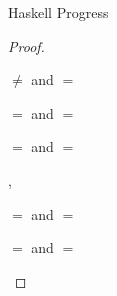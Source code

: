 \begin{theorem}{Haskell Progress}
\begin{proof}
\begin{case}{\pshm}
\begin{subcase}{\first{\vartyh} $\neq$ \tylump and \first{\vartym} $=$ \tylump}
\end{subcase}


\begin{subcase}{\first{\vartyh} $=$ \tynum and \first{\vartym} $=$ \tynum}

\psvaleqm
{\first{\varexpm}}
{\tynum}
{\expnum{\varnum}}
\psred
{\exphm{\tynum}{\tynum}{\expnum{\varnum}}}
{\expnum{\varnum}}

\end{subcase}


\renewcommand{\w}{\tylist{\second{\vartyh}}}
\renewcommand{\x}{\tylist{\second\vartym}}
\renewcommand{\y}{\expnils{\third{\vartym}}}
\renewcommand{\z}{\expcons{\first{\varvalum}}{\second{\varvalum}}}

\begin{subcase}{\first{\vartyh} $=$ \w and \first{\vartym} $=$ \x}

\psvalinm
{\first{\varexpm}}
{\tylist{\third{\vartym}}}
{\y, \z}
\psred
{\exphm{\w}{\x}{(\y)}}
{\expnils{\second{\vartyh}}}
\psred
{\exphm{\w}{\x}{(\z)}}
{\expcons{(\exphm{\second{\vartyh}}{\second{\vartym}}{\first{\varvalum}})}{(\exphm{\w}{\x}{\second{\varvalum}})}}

\end{subcase}


\renewcommand{\x}{\tyfun{\second{\vartyh}}{\third{\vartyh}}}
\renewcommand{\y}{\tyfun{\second{\vartym}}{\third{\vartym}}}
\renewcommand{\z}{\expfabss{\varvarm}{\fourth{\vartym}}{\second{\varexpm}}}

\begin{subcase}{\first{\vartyh} $=$ \x and \first{\vartym} $=$ \y}

\psvaleqm
{\first{\varexpm}}
{\tyfun{\fourth{\vartym}}{\fifth{\vartym}}}
{\z}
\psred
{\exphm{(\x)}{(\y)}{(\z)}}
{\expfabss{\varvarh}{\second{\vartyh}}{\exphm{\third{\vartyh}}{\third{\vartym}}{(\expfapp{(\z)}{(\expmh{\second{\vartym}}{\second{\vartyh}}{\varvarh})})}}}

\end{subcase}


\renewcommand{\x}{\tyfor{\first{\tyvarh}}{\second{\vartyh}}}
\renewcommand{\y}{\tyfor{\first{\tyvarm}}{\second{\vartym}}}
\renewcommand{\z}{\exptabs{\second{\tyvarm}}{\second{\varexpm}}}

\begin{subcase}{\first{\vartyh} $=$ \x and \first{\vartym} $=$ \y}


\end{subcase}
\end{case}
\end{proof}
\end{theorem}
